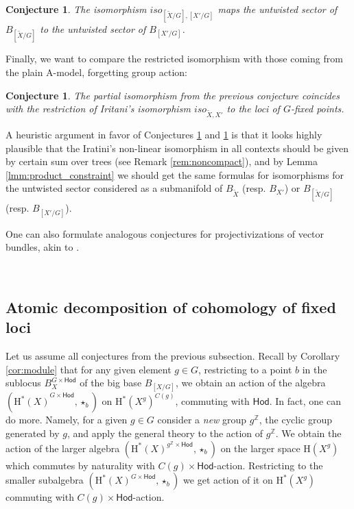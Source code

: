 \documentclass[12pt,a4paper]{amsart}
\newtheorem{conjecture}[theorem]{Conjecture}
\theoremstyle{definition}
\theoremstyle{remark}
\newcommand{\Z}{\mathbb{Z}}
\begin{document}
 \begin{conjecture}\label{conj:2}
     The isomorphism $iso_{[\widetilde X/G],[X'/G]}$ maps the untwisted sector of $B_{[\widetilde X/G]}$ to the  untwisted sector of $B_{[ X'/G]}$. 
 \end{conjecture}


Finally, we want to compare the restricted isomorphism with those coming from the plain A-model, forgetting group action:

\begin{conjecture}\label{conj:3}
    The partial isomorphism from the previous conjecture coincides with the restriction of Iritani's isomorphism $iso_{\widetilde X, X'}$
     to the loci of $G$-fixed points.
\end{conjecture}

A heuristic argument in favor of Conjectures \ref{conj:2} and \ref{conj:3} is that it looks highly plausible that the Iratini's non-linear isomorphism in all contexts should be given by certain sum over trees (see Remark \ref{rem:noncompact}), and  by Lemma \ref{lmm:product_constraint} we should get the same formulas for isomorphisms for the untwisted sector considered as a submanifold of $B_{\widetilde X}$ (resp. $B_{X'}$) or $B_{[\widetilde X/G]}$ (resp. $B_{[X'/G]}$).

One can also formulate analogous conjectures for projectivizations of vector bundles, akin to \cite{iritani2024quantumcohomologyprojectivebundles}.

\ 

\subsection{Atomic decomposition of cohomology of fixed loci}

Let us assume all conjectures from the previous subsection. Recall by Corollary \ref{cor:module}
that for any given element $g\in G$, restricting to a point $b$ in the sublocus $B_X^{G\times\mathsf{Hod}}$ of the big base $B_{[X/G]}$, we obtain an action of the algebra $({\mathrm H^\ast(X)}^{G\times\mathsf{Hod}},\star_b)$ on $\mathrm{H}^\ast(X^g)^{C(g)}$, commuting with $\mathsf{Hod}$. In fact, one can do more. Namely, for a given $g\in G$ consider a \textit{new} group $g^\Z$, the cyclic group generated by $g$, and apply the general theory to the action of $g^\Z$. We obtain the action of the larger algebra $(\mathrm H^\ast(X)^{g^\Z\times \mathsf{Hod}},\star_b)$ on the larger space  $\mathrm{H}(X^g)$ which commutes by naturality with $C(g) \times\mathsf{Hod}$-action. Restricting to the smaller subalgebra $(\mathrm H^\ast(X)^{G\times \mathsf{Hod}},\star_b)$ we get action of it on $\mathrm H^\ast(X^g)$ commuting with $C(g)\times\mathsf{Hod}$-action.
\end{document}
